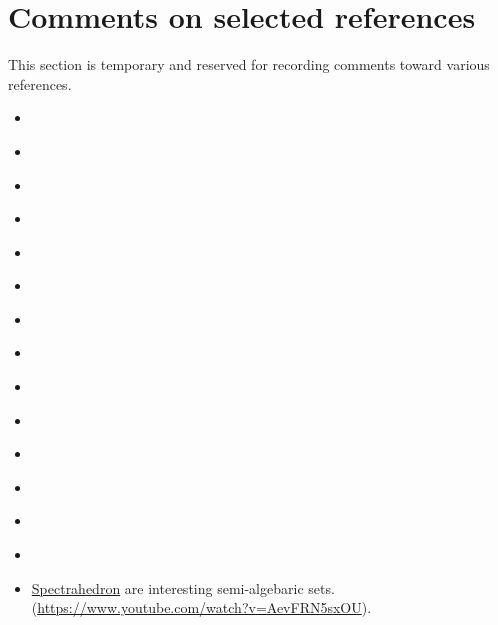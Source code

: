\documentclass[10pt]{article}
\theoremstyle{definition}
\theoremstyle{remark}
\begin{document}
\section*{Comments on selected references}
This section is temporary and reserved for recording comments toward various references.
\begin{itemize}
    \item \citeauthor{vistoli2004notes}~\cite{vistoli2004notes}
    \item \citeauthor{street1974fibrations}~\cite{street1974fibrations}
    \item \citeauthor{koudenburg2018categorical}~\cite{koudenburg2018categorical}
    \item \citeauthor{brown2009algebraic}~\cite{brown2009algebraic}
    \item \citeauthor{lurie2009higher}~\cite{lurie2009higher}
    \item \citeauthor{shulman2008framed}~\cite{shulman2008framed}
    \item \citeauthor{boyd2004convex}~\cite{boyd2004convex}
    \item \citeauthor{bogart2013hom}~\cite{bogart2013hom}
    \item \citeauthor{gubeladze2016affine}~\cite{gubeladze2016affine}
    \item \citeauthor{fausk2003isomorphisms}~\cite{fausk2003isomorphisms}
    \item \citeauthor{hofstra2011dialectica}~\cite{hofstra2011dialectica}
    \item \citeauthor{ponto2012duality}~\cite{ponto2012duality}
    \item \citeauthor{mac2013categories}~\cite{mac2013categories}
    \item \citeauthor{ziegler2012lectures}~\cite{ziegler2012lectures}
    \item \href{https://en.wikipedia.org/wiki/Spectrahedron}{Spectrahedron} are interesting semi-algebaric sets. (\url{https://www.youtube.com/watch?v=AevFRN5sxOU}).
\end{itemize}

\printbibliography
\end{document}
